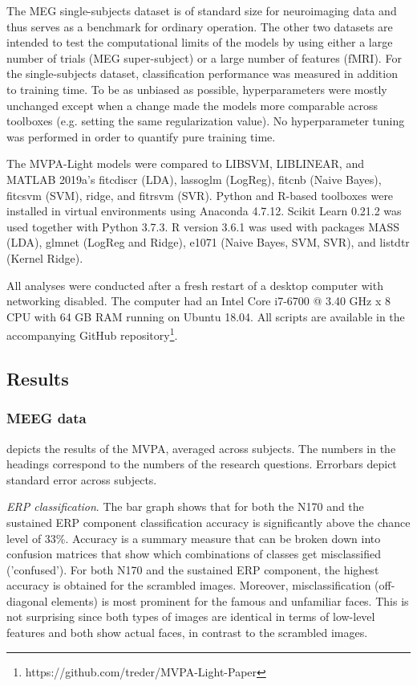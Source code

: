 \documentclass[utf8]{frontiersSCNS} %
\begin{document}
The MEG single-subjects dataset is of standard size for neuroimaging data and thus serves as a benchmark for ordinary operation. The other two datasets are intended to test the computational limits of the models by using either a large number of trials (MEG super-subject) or a large number of features (fMRI). For the single-subjects dataset, classification performance was measured in addition to training time.
To be as unbiased as possible, hyperparameters were mostly unchanged except when a change made the models more comparable across toolboxes (e.g. setting the same regularization value). No hyperparameter tuning was performed in order to quantify pure training time.

The MVPA-Light models were compared to LIBSVM,  LIBLINEAR, and MATLAB 2019a's fitcdiscr (LDA), lassoglm (LogReg), fitcnb (Naive Bayes), fitcsvm (SVM), ridge, and fitrsvm (SVR). Python and R-based toolboxes were installed in virtual environments using Anaconda 4.7.12. Scikit Learn 0.21.2 was used together with Python 3.7.3. R version 3.6.1 was used with packages MASS (LDA), glmnet (LogReg and Ridge), e1071 (Naive Bayes, SVM, SVR), and listdtr (Kernel Ridge).

All analyses were conducted after a fresh restart of a desktop computer with networking disabled. The computer had an Intel Core i7-6700 @ 3.40 GHz x 8 CPU with 64 GB RAM running on Ubuntu 18.04. All scripts are available in the accompanying GitHub repository\footnote{https://github.com/treder/MVPA-Light-Paper}. 

\subsection{Results}

\subsubsection{MEEG data}
 depicts the results of the MVPA, averaged across subjects. The numbers in the headings correspond to the numbers of the research questions. Errorbars depict standard error across subjects.

\textit{ERP classification}. The bar graph shows that for both the N170 and the sustained ERP component classification accuracy is significantly above the chance level of 33\%. Accuracy is a summary measure that can be broken down into confusion matrices that show which combinations of classes get misclassified ('confused'). For both N170 and the sustained ERP component, the highest accuracy is obtained for the scrambled images. Moreover,  misclassification (off-diagonal elements) is most prominent for the famous and unfamiliar faces. This is not surprising since both types of images are identical in terms of low-level features and both show actual faces, in contrast to the scrambled images. 
\end{document}
